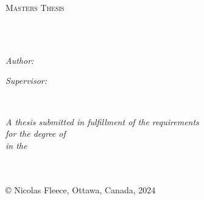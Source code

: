 \documentclass[
11pt, %
oneside, %
english, %
doublespacing, %
nolistspacing, %
headsepline, %
]{MastersDoctoralThesis} %
\author{Nicolas \textsc{Fleece}} %
\begin{document}
\frontmatter %

\pagestyle{plain} %


\begin{titlepage}
\begin{center}

\vspace*{.06\textheight}
{\scshape\LARGE \univname\par}\vspace{1.5cm} %
\textsc{\Large Masters Thesis}\\[0.5cm] %

\HRule \\[0.4cm] %
{\huge \bfseries \ttitle\par}\vspace{0.4cm} %
\HRule \\[1.5cm] %
 
\begin{minipage}[t]{0.4\textwidth}
\begin{flushleft} \large
\emph{Author:}\\
{\authorname} %
\end{flushleft}
\end{minipage}
\begin{minipage}[t]{0.4\textwidth}
\begin{flushright} \large
\emph{Supervisor:} \\
{\supname} %
\end{flushright}
\end{minipage}\\[3cm]
 
\vfill

\large \textit{A thesis submitted in fulfillment of the requirements\\ for the degree of \degreename}\\[0.3cm] %
\textit{in the}\\[0.4cm]
\groupname\\\deptname\\[2cm] %
 
\vfill

{\large © Nicolas Fleece, Ottawa, Canada, 2024}\\[4cm] %
 
\vfill
\end{center}
\end{titlepage}
\end{document}
